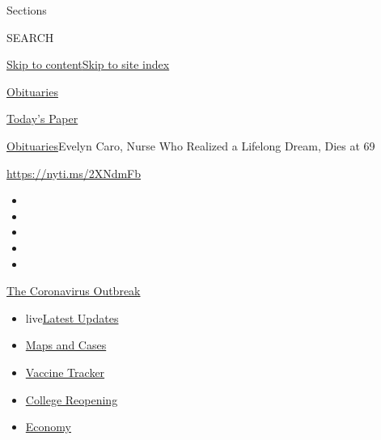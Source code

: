 Sections

SEARCH

\protect\hyperlink{site-content}{Skip to
content}\protect\hyperlink{site-index}{Skip to site index}

\href{https://www.nytimes3xbfgragh.onion/section/obituaries}{Obituaries}

\href{https://myaccount.nytimes3xbfgragh.onion/auth/login?response_type=cookie\&client_id=vi}{}

\href{https://www.nytimes3xbfgragh.onion/section/todayspaper}{Today's
Paper}

\href{/section/obituaries}{Obituaries}\textbar{}Evelyn Caro, Nurse Who
Realized a Lifelong Dream, Dies at 69

\url{https://nyti.ms/2XNdmFb}

\begin{itemize}
\item
\item
\item
\item
\item
\end{itemize}

\href{https://www.nytimes3xbfgragh.onion/news-event/coronavirus?action=click\&pgtype=Article\&state=default\&region=TOP_BANNER\&context=storylines_menu}{The
Coronavirus Outbreak}

\begin{itemize}
\tightlist
\item
  live\href{https://www.nytimes3xbfgragh.onion/2020/08/04/world/coronavirus-covid-19.html?action=click\&pgtype=Article\&state=default\&region=TOP_BANNER\&context=storylines_menu}{Latest
  Updates}
\item
  \href{https://www.nytimes3xbfgragh.onion/interactive/2020/us/coronavirus-us-cases.html?action=click\&pgtype=Article\&state=default\&region=TOP_BANNER\&context=storylines_menu}{Maps
  and Cases}
\item
  \href{https://www.nytimes3xbfgragh.onion/interactive/2020/science/coronavirus-vaccine-tracker.html?action=click\&pgtype=Article\&state=default\&region=TOP_BANNER\&context=storylines_menu}{Vaccine
  Tracker}
\item
  \href{https://www.nytimes3xbfgragh.onion/2020/08/02/us/covid-college-reopening.html?action=click\&pgtype=Article\&state=default\&region=TOP_BANNER\&context=storylines_menu}{College
  Reopening}
\item
  \href{https://www.nytimes3xbfgragh.onion/live/2020/08/03/business/stock-market-today-coronavirus?action=click\&pgtype=Article\&state=default\&region=TOP_BANNER\&context=storylines_menu}{Economy}
\end{itemize}

